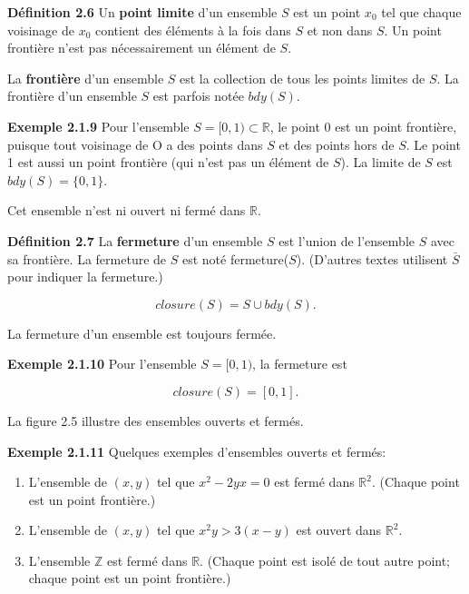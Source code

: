 \documentclass[11pt,twoside,a4paper]{article}
\begin{document}
\textbf{Définition 2.6} Un \textbf{point limite} d'un ensemble $S$ est un point $x_0$ tel que chaque voisinage de $x_0$ contient des éléments à la fois dans $S$ et non dans $S$. Un point frontière n'est pas nécessairement un élément de $S$.

La \textbf{frontière} d'un ensemble $S$ est la collection de tous les points limites de $S$. La frontière d'un ensemble $S$ est parfois notée $bdy(S)$.

\textbf{Exemple 2.1.9} Pour l'ensemble $S = [0, 1) \subset \mathbb{R}$, le point 0 est un point frontière, puisque tout voisinage de O a des points dans $S$ et des points hors de $S$. Le point 1 est aussi un point frontière (qui n'est pas un élément de $S$). La limite de $S$ est $bdy(S) = \{0, 1\}$.

Cet ensemble n'est ni ouvert ni fermé dans $\mathbb{R}$.

\textbf{Définition 2.7} La \textbf{fermeture} d'un ensemble $S$ est l'union de l'ensemble $S$ avec sa frontière. La fermeture
de $S$ est noté fermeture($S$). (D'autres textes utilisent $\bar{S}$ pour indiquer la fermeture.)

\begin{equation*}
  closure(S) = S \cup bdy(S).
\end{equation*}

La fermeture d'un ensemble est toujours fermée.

\textbf{Exemple 2.1.10} Pour l'ensemble $S = [0, 1)$, la fermeture est

\begin{equation*}
  closure(S) = [0, 1].
\end{equation*}


La figure 2.5 illustre des ensembles ouverts et fermés.


\textbf{Exemple 2.1.11} Quelques exemples d'ensembles ouverts et fermés:

\begin{enumerate}
  \item L'ensemble de $(x, y)$ tel que $x^2-2yx = 0$ est fermé dans $\mathbb{R}^2$. (Chaque point est un point frontière.)
  \item L'ensemble de $(x, y)$ tel que $x^2y > 3(x - y)$ est ouvert dans $\mathbb{R}^2$.
  \item L'ensemble $\mathbb{Z}$ est fermé dans $\mathbb{R}$. (Chaque point est isolé de tout autre point; chaque point est un point frontière.)
\end{enumerate}
\end{document}
